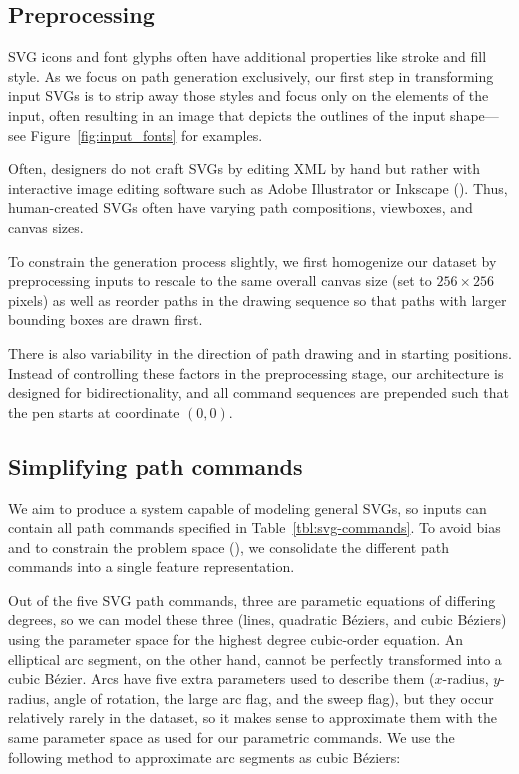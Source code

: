 \subsection{Preprocessing}
SVG icons and font glyphs often have additional properties like stroke and fill style.
As we focus on path generation exclusively, our first step in transforming input SVGs is to strip away those styles and focus only on the  elements of the input, often resulting in an image that depicts the outlines of the input shape---see Figure~\ref{fig:input_fonts} for examples.

Often, designers do not craft SVGs by editing XML by hand but rather with interactive image editing software such as Adobe Illustrator or Inkscape ().
Thus, human-created SVGs often have varying path compositions, viewboxes, and canvas sizes.

To constrain the generation process slightly, we first homogenize our dataset by preprocessing inputs to rescale to the same overall canvas size (set to $256\times 256$ pixels) as well as reorder paths in the drawing sequence so that paths with larger bounding boxes are drawn first.

There is also variability in the direction of path drawing and in starting positions. Instead of controlling these factors in the preprocessing stage, our architecture is designed for bidirectionality, and all command sequences are prepended such that the pen starts at coordinate $(0, 0)$.

\subsection{Simplifying path commands}
We aim to produce a system capable of modeling general SVGs, so inputs can contain all path commands specified in Table~\ref{tbl:svg-commands}.
To avoid bias and to constrain the problem space (), we consolidate the different path commands into a single feature representation.

Out of the five SVG path commands, three are parametic equations of differing degrees, so we can model these three (lines, quadratic B\'eziers, and cubic B\'eziers) using the parameter space for the highest degree cubic-order equation.
An elliptical arc segment, on the other hand, cannot be perfectly transformed into a cubic B\'ezier. Arcs have five extra parameters used to describe them ($x$-radius, $y$-radius, angle of rotation, the large arc flag, and the sweep flag), but they occur relatively rarely in the dataset, so it makes sense to approximate them with the same parameter space as used for our parametric commands.
We use the following method to approximate arc segments as cubic B\'eziers:

